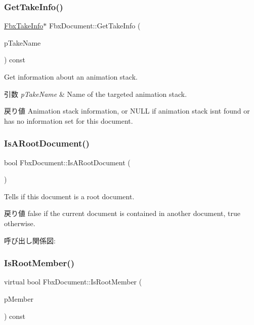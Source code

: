 \subsubsection{\texorpdfstring{Get\+Take\+Info()}{GetTakeInfo()}}
{\footnotesize\ttfamily \hyperlink{class_fbx_take_info}{Fbx\+Take\+Info}$\ast$ Fbx\+Document\+::\+Get\+Take\+Info (\begin{DoxyParamCaption}\item[{const \hyperlink{class_fbx_string}{Fbx\+String} \&}]{p\+Take\+Name }\end{DoxyParamCaption}) const}

Get information about an animation stack. 
\begin{DoxyParams}{引数}
{\em p\+Take\+Name} & Name of the targeted animation stack. \\
\hline
\end{DoxyParams}
\begin{DoxyReturn}{戻り値}
Animation stack information, or {\ttfamily N\+U\+LL} if animation stack isn\textquotesingle{}t found or has no information set for this document. 
\end{DoxyReturn}
\mbox{\label{class_fbx_document_a34d240ba6a8ac2061343806431d104f9}} 
\subsubsection{\texorpdfstring{Is\+A\+Root\+Document()}{IsARootDocument()}}
{\footnotesize\ttfamily bool Fbx\+Document\+::\+Is\+A\+Root\+Document (\begin{DoxyParamCaption}\item[{void}]{ }\end{DoxyParamCaption})}

Tells if this document is a root document. \begin{DoxyReturn}{戻り値}
{\ttfamily false} if the current document is contained in another document, {\ttfamily true} otherwise. 
\end{DoxyReturn}
呼び出し関係図\+:
\mbox{\label{class_fbx_document_ad20c1fe26a675684facd0f0d79de4b2a}} 
\subsubsection{\texorpdfstring{Is\+Root\+Member()}{IsRootMember()}}
{\footnotesize\ttfamily virtual bool Fbx\+Document\+::\+Is\+Root\+Member (\begin{DoxyParamCaption}\item[{\hyperlink{class_fbx_object}{Fbx\+Object} $\ast$}]{p\+Member }\end{DoxyParamCaption}) const\hspace{0.3cm}{\ttfamily [virtual]}}

